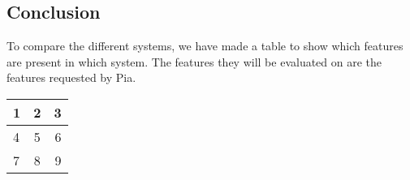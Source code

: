 \subsection{Conclusion}
To compare the different systems, we have made a table to show which features are present in which system. The features they will be evaluated on are the features requested by Pia.
\begin{center}
  \begin{tabular}{ l | c | r }
    \hline
    1 & 2 & 3 \\ \hline
    4 & 5 & 6 \\ \hline
    7 & 8 & 9 \\
    \hline
  \end{tabular}
\end{center}

